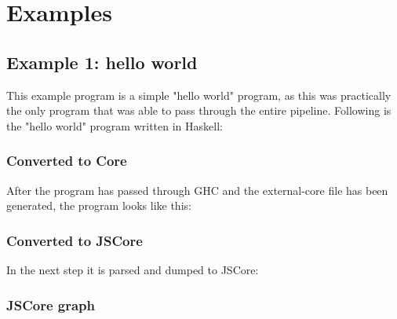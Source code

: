 
\section{Examples}

\lstset{ %
basicstyle=\scriptsize,         %
numbers=left,                   %
numberstyle=\scriptsize,        %
frame=single,                   %
tabsize=2,                      %
captionpos=b,                   %
breaklines=true,                %
breakatwhitespace=false,        %
gobble=\the\numexpr\WScount+2\relax,
title=\lstname,			%
}

\subsection{Example 1: hello world}

This example program is a simple "hello world" program, as this was practically
the only program that was able to pass through the entire pipeline. Following
is the "hello world" program written in Haskell:



\subsubsection{Converted to Core}

After the program has passed through GHC and the external-core file
has been generated, the program looks like this:



\subsubsection{Converted to JSCore}

In the next step it is parsed and dumped to JSCore:



\subsubsection{JSCore graph}

